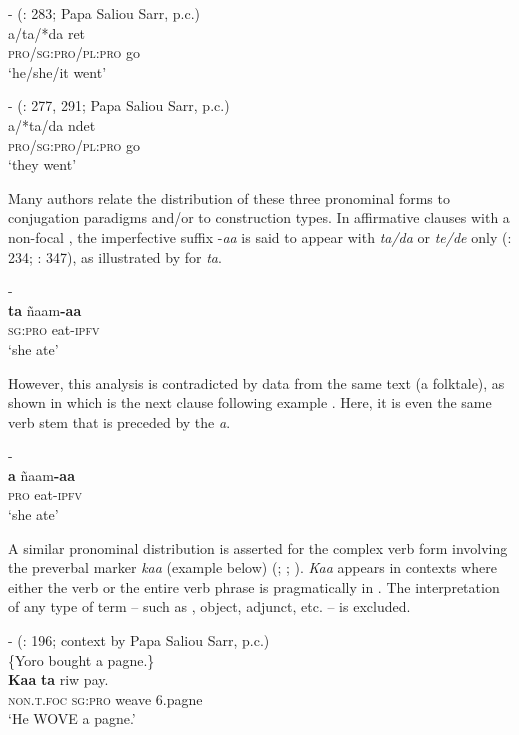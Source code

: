 \documentclass[output=paper,newtxmath,modfonts,nonflat,hidelinks]{langsci/langscibook}
\begin{document}
\ea\label{ex:apel:4}
\ea\label{ex:apel:4a}- (\citealt{Faye1979}: 283; Papa Saliou Sarr, p.c.)\\
\gll a/ta/*da ret\\
     \textsc{pro/sg:pro/pl:pro} go \\
\glt ‘he/she/it went’ 

\ex\label{ex:apel:4b}{- (\citealt{Faye1979}: 277, 291; Papa Saliou Sarr, p.c.)}\\
\gll a/*ta/da ndet \\
     \textsc{pro/sg:pro/pl:pro} go  \\
\glt ‘they went’
\z
\z

Many authors relate the distribution of these three pronominal forms to conjugation paradigms and/or to construction types. In affirmative clauses with a non-focal , the imperfective suffix -\textit{aa} is said to appear with \textit{ta/da} or \textit{te/de} only (\citealt{Faye1979}: 234; \citealt{Renaudier2012}: 347), as illustrated by  for \textit{ta}.

\ea\label{ex:apel:5}{- \citep[283]{Faye1979}}\\
\gll \textbf{ta} ñaam\textbf{-aa}\\
     \textsc{sg:pro} eat\textsc{-ipfv}\\
\glt ‘she ate’
\z

However, this analysis is contradicted by data from the same text (a folktale), as shown in  which is the next clause following example . Here, it is even the same verb stem that is preceded by the  \textit{a}.
\pagebreak

\ea\label{ex:apel:6}{- \citep[283]{Faye1979}}\\
\gll \textbf{a} ñaam\textbf{-aa}\\
     \textsc{pro} eat\textsc{-ipfv}\\
\glt ‘she ate’
\z

A similar pronominal distribution is asserted for the complex verb form involving the preverbal marker \textit{kaa} (example  below) (\citealt[234]{Faye1979}; \citealt[91f]{FayeMous06}; \citealt[348]{Renaudier2012}). \textit{Kaa} appears in contexts where either the verb or the entire verb phrase is pragmatically in . The interpretation of any type of term  -- such as , object, adjunct, etc. -- is excluded.

\ea\label{ex:apel:7}{- (\citealt{Faye1979}: 196; context by Papa Saliou Sarr,   p.c.)}\\
{\-\hspace{0cm}\{Yoro bought a pagne.\}}\\
\gll   \textbf{Kaa} \textbf{ta} riw pay.\\
     \textsc{non.t.foc} \textsc{sg:pro} weave \textsc{6.}pagne\\
\glt ‘He WOVE a pagne.’ 
\z
\end{document}

